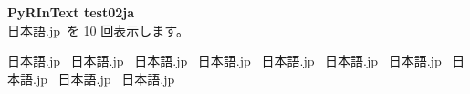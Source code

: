 \documentclass[pdflatex, jadriver=standard]{bxjsarticle}
\begin{document}
{\Large\bf PyRInText test02ja}\\

日本語.jp~を 10 回表示します。\par \vspace{1mm}
日本語.jp~
日本語.jp~
日本語.jp~
日本語.jp~
日本語.jp~
日本語.jp~
日本語.jp~
日本語.jp~
日本語.jp~
日本語.jp~
\end{document}
